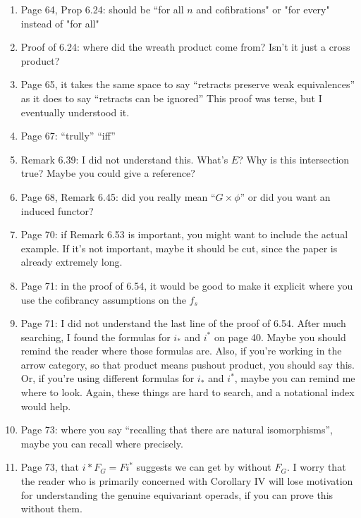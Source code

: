 \documentclass{article}
\begin{document}
\begin{enumerate}
\item
Page 64, Prop 6.24: should be ``for all $n$ and cofibrations" or "for every" instead of "for all"


\item
Proof of 6.24: where did the wreath product come from? Isn't it just a cross product?

\item
Page 65, it takes the same space to say ``retracts preserve weak equivalences'' as it does to say ``retracts can be ignored''
This proof was terse, but I eventually understood it.

\item
Page 67: ``trully''
``iff''

\item
Remark 6.39: I did not understand this. What's $E$? Why is this intersection true? Maybe you could give a reference?


\item
Page 68, Remark 6.45: did you really mean ``$G \times \phi$'' or did you want an induced functor?

\item
Page 70: if Remark 6.53 is important, you might want to include the actual example. If it's not important, maybe it should be cut, since the paper is already extremely long.

\item
Page 71: in the proof of 6.54, it would be good to make it explicit where you use the cofibrancy assumptions on the $f_s$

\item
Page 71: I did not understand the last line of the proof of 6.54. After much searching, I found the formulas for $i_*$ and $i^*$ on page 40. Maybe you should remind the reader where those formulas are. Also, if you're working in the arrow category, so that product means pushout product, you should say this. Or, if you're using different formulas for $i_*$ and $i^*$, maybe you can remind me where to look. Again, these things are hard to search, and a notational index would help.

\item
Page 73: where you say ``recalling that there are natural isomorphisms'', maybe you can recall where precisely.

\item
Page 73, that $i* F_G = F i^*$ suggests we can get by without $F_G$. I worry that the reader who is primarily concerned with Corollary IV will lose motivation for understanding the genuine equivariant operads, if you can prove this without them.


\end{enumerate}
\end{document}
